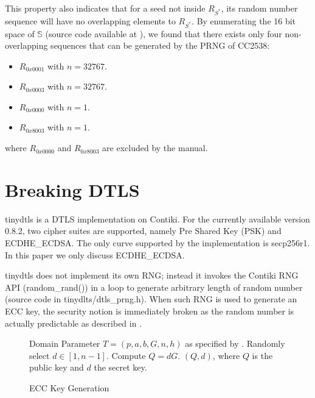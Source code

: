 This property also indicates that for a seed not inside $R_{S^*}$, its random number sequence will have no overlapping elements to $R_{S^*}$. By enumerating the 16 bit space of $\mathbb{S}$ (source code available at \cite{prngtest}), we found that there exists only four non-overlapping sequences that can be generated by the PRNG of CC2538:
\begin{itemize}
	\item $R_{0x0001}$ with $n = 32767$.
	\item $R_{0x0003}$ with $n = 32767$.
	\item $R_{0x0000}$ with $n = 1$.
	\item $R_{0x8003}$ with $n = 1$.
\end{itemize}
where $R_{0x0000}$ and $R_{0x8003}$ are excluded by the manual\cite{CC2538Manual}. 

\section{Breaking DTLS} \label{BreakDTLS}
tinydtls\cite{tinydtls} is a DTLS implementation on Contiki. For the currently available version 0.8.2\cite{tinydtls082},  two cipher suites are supported, namely Pre Shared Key (PSK) and ECDHE\_ECDSA\cite{rfc4492}. The only curve supported by the implementation is secp256r1\cite{secp256r1}. In this paper we only discuss ECDHE\_ECDSA.


tinydtls does not implement its own RNG; instead it invokes the Contiki RNG API (random\_rand()) in a loop to generate arbitrary length of random number (source code in tinydlts/dtls\_prng.h). When such RNG is used to generate an ECC key, the security notion is immediately broken as the random number is actually predictable as described in .
\begin{figure}
	\begin{algorithmic}[1]
	\scriptsize
	\REQUIRE Domain Parameter $T = (p, a, b, G, n, h)$ as specified by \cite{secp256r1}.
	\STATE Randomly select $d \in [1, n-1]$.
	\STATE Compute $Q = dG$.
	\RETURN $(Q,d)$, where $Q$ is the public key and $d$ the secret key.
	\end{algorithmic}
	\caption{ECC Key Generation}
	\label{KeyGen}
\end{figure}

